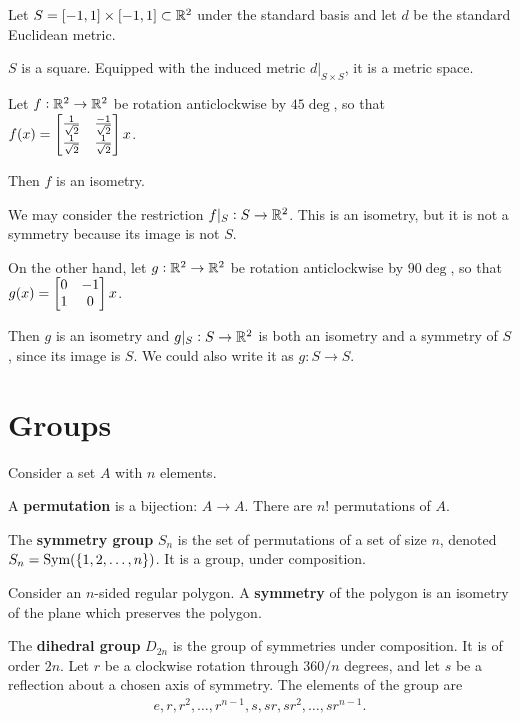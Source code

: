 \begin{example*}
  Let $S = [-1, 1] \times [-1, 1] \subset \mathbb{R}^2$ under the standard basis and let $d$ be the
  standard Euclidean metric.

  $S$ is a square. Equipped with the induced metric $d|_{S\times S}$, it is a metric space.

  Let $f:\mathbb{R}^2 \to \mathbb{R}^2$ be rotation anticlockwise by $45\deg$, so that
  $f(x) = \begin{bmatrix}\frac{1}{\sqrt{2}} & \frac{-1}{\sqrt{2}}\\\frac{1}{\sqrt{2}} & \frac{1}{\sqrt{2}}\\ \end{bmatrix}x$.

  Then $f$ is an isometry.

  We may consider the restriction $f|_S: S \to \mathbb{R}^2$. This is an isometry, but it is not a symmetry
  because its image is not $S$.

  On the other hand, let $g:\mathbb{R}^2 \to \mathbb{R}^2$ be rotation anticlockwise by $90\deg$, so that
  $g(x) = \begin{bmatrix}0 & -1\\1 & 0\\ \end{bmatrix}x$.

  Then $g$ is an isometry and $g|_S: S \to \mathbb{R}^2$ is both an isometry and a symmetry of $S$, since
  its image is $S$. We could also write it as $g: S \to S$.
\end{example*}


\section{Groups}

Consider a set $A$ with $n$ elements.

\begin{definition*}
  A \textbf{permutation} is a bijection: $A \to A$. There are $n!$ permutations of $A$.
\end{definition*}

\begin{definition*}
  The \textbf{symmetry group} $S_n$ is the set of permutations of a set of size $n$, denoted
  $S_n = \text{Sym}(\{1,2,\ldots,n\})$. It is a group, under composition.
\end{definition*}

\begin{definition*}
  Consider an $n$-sided regular polygon. A \textbf{symmetry} of the polygon is an isometry of the
  plane which preserves the polygon.
\end{definition*}

\begin{definition*}
  The \textbf{dihedral group}
  $D_{2n}$ is the group of symmetries under composition. It is of order $2n$. Let
  $r$ be a clockwise rotation through $360/n$ degrees, and let $s$ be a
  reflection about a chosen axis of symmetry. The elements of the group are
  \begin{align*}
    e, r, r^2, \ldots, r^{n-1}, s, sr, sr^2, \ldots, sr^{n-1}.
  \end{align*}
\end{definition*}

